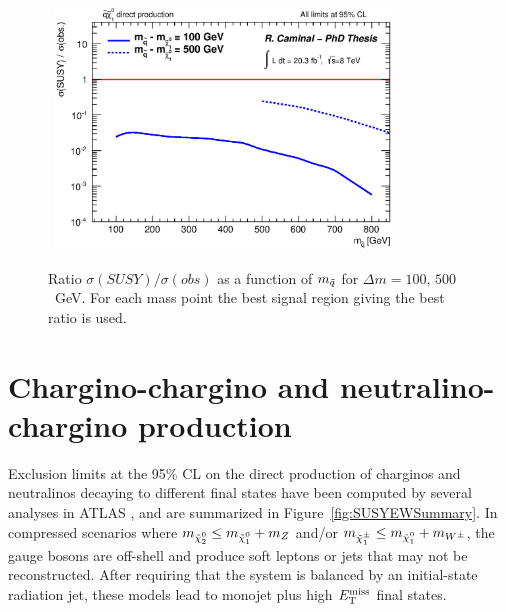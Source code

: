 \begin{figure}[!ht]
\begin{center}
\mbox{
\includegraphics[width=0.795\textwidth]{Interpretations/Figures/sq_neu_limits.eps}
}
\end{center}
\caption[Ratio $\sigma (SUSY) / \sigma (obs)$ as a function of $m_{\squark}$ for different $\Delta m$ values.]{Ratio $\sigma (SUSY) / \sigma (obs)$ as a function of $m_{\squark}$ for $\Delta m = 100,\, 500$~GeV. For each mass point the best signal region giving the best ratio is used.}
\label{fig:squarkNeutralinoLimits}
\end{figure}


\section{Chargino-chargino and neutralino-chargino production}
    \label{subsec:NeutralinoCharginoProduction}

Exclusion limits at the 95\% CL on the direct production of charginos and neutralinos decaying to different final states have been computed by several analyses in ATLAS \cite{Aad:2014nua}, and are summarized in Figure~\ref{fig:SUSYEWSummary}.
In compressed scenarios where $m_{\ninotwo} \leq m_{\ninoone} + m_Z$ and/or $m_{\chinoonepm} \leq m_{\ninoone} + m_{W^{\pm}}$, the gauge bosons are off-shell and produce soft leptons or jets that may not be reconstructed.
After requiring that the system is balanced by an initial-state radiation jet, these models lead to monojet plus high $E_{\mathrm{T}}^{\mathrm{miss}}$ final states.

